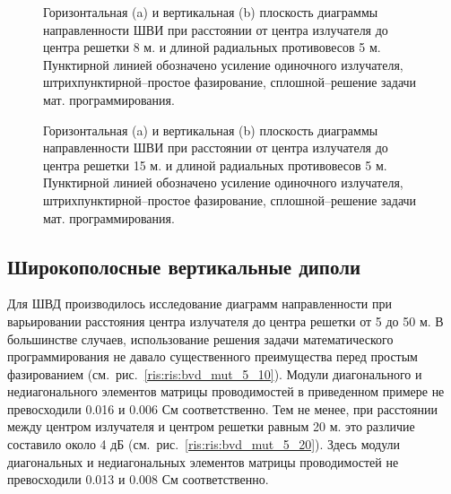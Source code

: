 \begin{figure}
\begin{minipage}[h]{0.49\linewidth}
\end{minipage}
\hfill
\begin{minipage}[h]{0.49\linewidth}
\end{minipage}
\caption{Горизонтальная (a) и вертикальная (b) плоскость диаграммы направленности ШВИ при расстоянии от центра излучателя до центра решетки 8 м. и длиной радиальных противовесов 5 м. Пунктирной линией обозначено усиление одиночного излучателя, штрихпунктирной--простое фазирование, сплошной--решение задачи мат. программирования.}
\label{ris:bve_mut_5_8}
\end{figure}

\begin{figure}
\begin{minipage}[h]{0.49\linewidth}
\end{minipage}
\hfill
\begin{minipage}[h]{0.49\linewidth}
\end{minipage}
\caption{Горизонтальная (a) и вертикальная (b) плоскость диаграммы направленности ШВИ при расстоянии от центра излучателя до центра решетки 15 м. и длиной радиальных противовесов 5 м. Пунктирной линией обозначено усиление одиночного излучателя, штрихпунктирной--простое фазирование, сплошной--решение задачи мат. программирования.}
\label{ris:bve_mut_5_15}
\end{figure}

\subsection{Широкополосные вертикальные диполи}

Для ШВД производилось исследование диаграмм направленности при варьировании расстояния центра излучателя до центра решетки от 5 до 50 м. В большинстве случаев, использование решения задачи математического программирования не давало существенного преимущества перед простым фазированием (см.~рис.~\ref{ris:ris:bvd_mut_5_10}). Модули диагонального и недиагонального элементов матрицы проводимостей в приведенном примере не превосходили 0.016 и 0.006 См соответственно.  Тем не менее, при расстоянии между центром излучателя и центром решетки равным 20 м. это различие составило около 4 дБ (см.~рис.~\ref{ris:ris:bvd_mut_5_20}). Здесь модули диагональных и недиагональных элементов матрицы проводимостей не превосходили 0.013 и 0.008 См соответственно.

